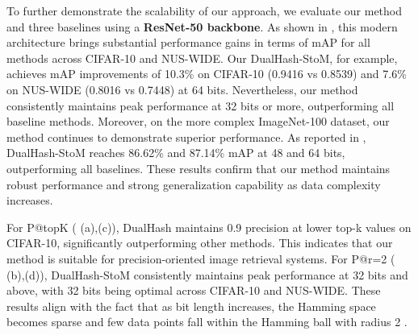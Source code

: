 To further demonstrate the scalability of our approach, we evaluate our method and three baselines using a \textbf{ResNet-50 backbone}. As shown in , this modern architecture brings substantial performance gains in terms of mAP for all methods across CIFAR-10 and NUS-WIDE. Our DualHash-StoM, for example, achieves mAP improvements of 10.3\% on CIFAR-10 (0.9416 vs 0.8539) and 7.6\% on NUS-WIDE (0.8016 vs 0.7448) at 64 bits. Nevertheless, our method consistently maintains peak performance at 32 bits or more, outperforming all baseline methods. Moreover, on the more complex ImageNet-100 dataset, our method continues to demonstrate superior performance. As reported in , DualHash-StoM reaches 86.62\% and 87.14\% mAP at 48 and 64 bits, outperforming all baselines. These results confirm that our method maintains robust performance and strong generalization capability as data complexity increases.

For P@topK ( (a),(c)), DualHash maintains 0.9 precision at lower top-k values on CIFAR-10, significantly outperforming other methods. This indicates that our method is suitable for precision-oriented image retrieval systems.
For P@r=2 ( (b),(d)), DualHash-StoM consistently maintains peak performance at 32 bits and above, with 32 bits being optimal across CIFAR-10 and NUS-WIDE. These results align with the fact that as bit length increases, the Hamming space becomes sparse and few data points fall within the Hamming ball with radius 2 \cite{norouzi2012fast}.

